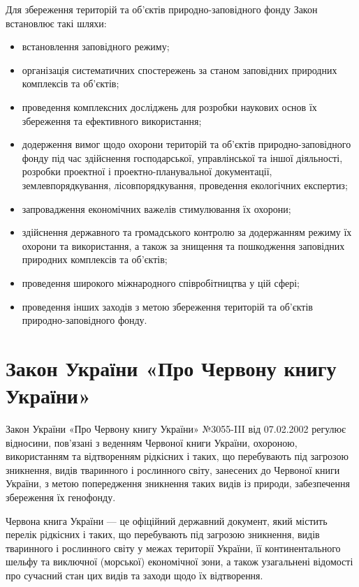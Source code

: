\documentclass[a4paper,oneside,DIV=10,12pt]{scrreprt}
\begin{document}
			Для збереження територій та об'\-єк\-тів  природно-заповідного фонду Закон встановлює такі шляхи:
			\begin{itemize}
				\item встановлення заповідного режиму;
				\item організація систематичних спостережень за станом заповідних природних комплексів та об'\-єк\-тів;
				\item проведення комплексних досліджень для розробки наукових основ їх збереження та ефективного використання;
				\item додерження вимог щодо охорони територій та об'\-єк\-тів при\-род\-но-за\-по\-від\-ного фонду під час здійснення господарської, управлінської та іншої діяльності, розробки проектної і проектно-планувальної документації, землевпорядкування, лісовпорядкування, проведення екологічних експертиз;
				\item запровадження економічних важелів стимулювання їх охорони;
				\item здійснення державного та громадського контролю за додержанням режиму їх охорони та використання, а також за знищення та пошкодження заповідних природних комплексів та об'\-єк\-тів;
				\item проведення широкого міжнародного співробітництва у цій сфері;
				\item проведення інших заходів з метою збереження територій та об'\-єк\-тів природно-заповідного фонду.
			\end{itemize}
			
			
		\section{Закон України «Про Червону книгу України»}
			Закон України «Про Червону книгу України» №3055-III від 07.02.2002 регулює відносини, пов'язані з веденням Червоної книги України, охороною, використанням та відтворенням рідкісних і таких, що перебувають під загрозою зникнення, видів тваринного і рослинного світу, занесених до Червоної книги України, з метою попередження зникнення таких видів із природи, забезпечення збереження їх генофонду.
			
			Червона книга України --- це офіційний державний документ, який містить перелік рідкісних і таких, що перебувають під загрозою зникнення, видів тваринного і рослинного світу у межах території України, її континентального шельфу та виключної (морської) економічної зони, а також узагальнені відомості про сучасний стан цих видів та заходи щодо їх відтворення.
			
\end{document}
